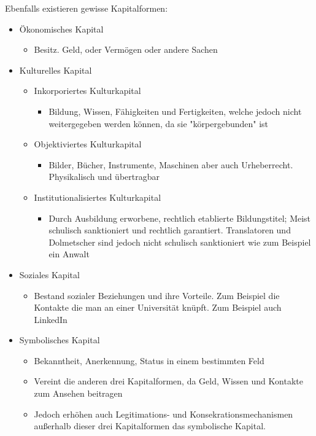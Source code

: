 \documentclass{article}
\begin{document}
	Ebenfalls existieren gewisse Kapitalformen:
	\begin{itemize}
		\item{Ökonomisches Kapital}
		\begin{itemize}
			\item{Besitz. Geld, oder Vermögen oder andere Sachen}
		\end{itemize}
		\item{Kulturelles Kapital}
		\begin{itemize}
			\item{Inkorporiertes Kulturkapital}
			\begin{itemize}
				\item{Bildung, Wissen, Fähigkeiten und Fertigkeiten, welche jedoch nicht weitergegeben werden können, da sie "körpergebunden" ist}
			\end{itemize}
			\item{Objektiviertes Kulturkapital}
			\begin{itemize}
				\item{Bilder, Bücher, Instrumente, Maschinen aber auch Urheberrecht. Physikalisch und übertragbar}
			\end{itemize}
			\item{Institutionalisiertes Kulturkapital}
			\begin{itemize}
				\item{Durch Ausbildung erworbene, rechtlich etablierte Bildungstitel; Meist schulisch sanktioniert und rechtlich garantiert. Translatoren und Dolmetscher sind jedoch nicht schulisch sanktioniert wie zum Beispiel ein Anwalt}
			\end{itemize}
		\end{itemize}
		\item{Soziales Kapital}
		\begin{itemize}
			\item{Bestand sozialer Beziehungen und ihre Vorteile. Zum Beispiel die Kontakte die man an einer Universität knüpft. Zum Beispiel auch LinkedIn}
		\end{itemize}
		\item{Symbolisches Kapital}
		\begin{itemize}
			\item{Bekanntheit, Anerkennung, Status in einem bestimmten Feld}
			\item{Vereint die anderen drei Kapitalformen, da Geld, Wissen und Kontakte zum Ansehen beitragen}
			\item{Jedoch erhöhen auch Legitimations- und Konsekrationsmechanismen außerhalb dieser drei Kapitalformen das symbolische Kapital.}
		\end{itemize}
	\end{itemize}
\end{document}
